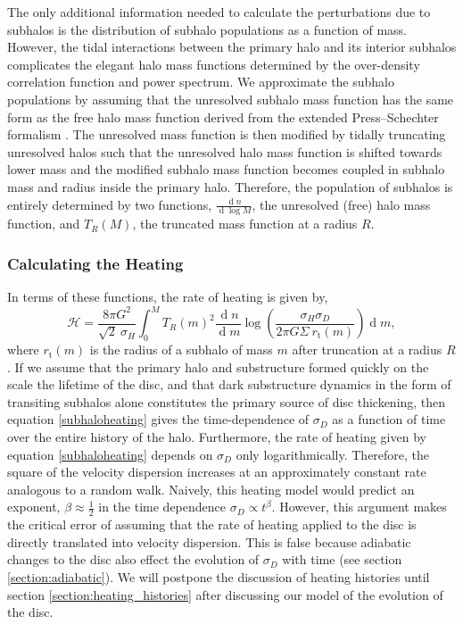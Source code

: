 \documentclass[usenatbib]{mnras}
\renewcommand{\d}[1]{\! \mathrm{d}#1 \:}
\newcommand{\deriv}[2]{\frac{\d{#1}}{\d{#2}}}
\renewcommand{\d}[1]{\ensuremath{\operatorname{d}\!{#1}}}
\begin{document}
The only additional information needed to calculate the perturbations due to subhalos is the distribution of subhalo populations as a function of mass. However, the tidal interactions between the primary halo and its interior subhalos complicates the elegant halo mass functions determined by the over-density correlation function and power spectrum. We approximate the subhalo populations by assuming that the unresolved subhalo mass function has the same form as the free halo mass function derived {\color{red} from the extended Press--Schechter formalism \citep{press-schechter, excursion-set}}. The unresolved mass function is then modified by tidally truncating unresolved halos such that the unresolved halo mass function is shifted towards lower mass and the modified subhalo mass function becomes coupled in subhalo mass and radius inside the primary halo. Therefore, the population of subhalos is entirely determined by two functions, $\frac{\d{n}}{\d{\log{M}}}$, the unresolved (free) halo mass function, and $T_R(M)$, the truncated mass function at a radius $R$. 
\subsubsection{Calculating the Heating}
In terms of these functions, the rate of heating is given by,
\begin{equation} \label{subhaloheating}
\mathcal{H} = \frac{8 \pi G^2}{\sqrt{2} \: \sigma_H} \int_0^{M} T_R(m)^2  \deriv{n}{m}  \log{\left( \frac{\sigma_H \sigma_D}{2 \pi G \Sigma \: r_{\text{t}}(m)} \right)} \d{m},
\end{equation}   
where $r_{\text{t}}(m)$ is the radius of a subhalo of mass $m$ after truncation at a radius $R$. 
If we assume that the primary halo and substructure formed quickly on the scale the lifetime of the disc, and that dark substructure dynamics in the form of transiting subhalos alone constitutes the primary source of disc thickening, then equation \eqref{subhaloheating} gives the time-dependence of $\sigma_D$ as a function of time over the entire history of the halo. Furthermore, the rate of heating given by equation \eqref{subhaloheating} depends on $\sigma_D$ only logarithmically. Therefore, the square of the velocity dispersion increases at an approximately constant rate analogous to a random walk. { \color{magenta} Naively, this heating model would predict an exponent, $\beta \approx \tfrac{1}{2}$ in the time dependence $\sigma_D \propto t^{\beta}$. However, this argument makes the critical error of assuming that the rate of heating applied to the disc is directly translated into velocity dispersion. This is false because adiabatic changes to the disc also effect the evolution of $\sigma_D$ with time (see section \ref{section:adiabatic}). We will postpone the discussion of heating histories until section \ref{section:heating_histories} after discussing our model of the evolution of the disc.}
\end{document}
